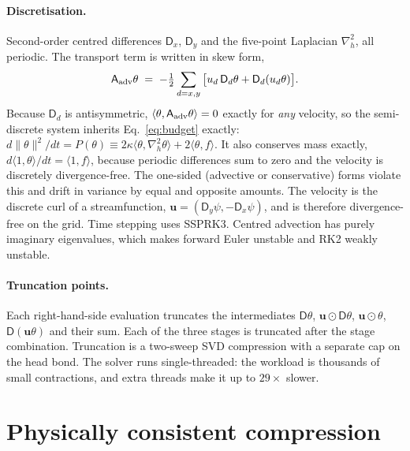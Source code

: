 \documentclass[aps,prfluids,reprint,onecolumn,amsmath,amssymb,nofootinbib,floatfix]{revtex4-2}
\begin{document}
\paragraph{Discretisation.} Second-order centred differences $\mathsf{D}_x$,
$\mathsf{D}_y$ and the five-point Laplacian $\nabla_h^2$, all periodic. The
transport term is written in skew form,
\begin{equation}
\mathsf{A}_{\rm adv}\theta \;=\; -\tfrac12\sum_{d=x,y}\big[u_d\,\mathsf{D}_d\theta
+ \mathsf{D}_d(u_d\theta)\big].
\label{eq:skew}
\end{equation}
Because $\mathsf{D}_d$ is antisymmetric, $\langle\theta,\mathsf{A}_{\rm adv}\theta\rangle=0$
exactly for \emph{any} velocity, so the semi-discrete system inherits
Eq.~\eqref{eq:budget} exactly:
$d\|\theta\|^2/dt = P(\theta) \equiv 2\kappa\langle\theta,\nabla_h^2\theta\rangle + 2\langle\theta,f\rangle$.
It also conserves mass exactly, $d\langle1,\theta\rangle/dt=\langle1,f\rangle$,
because periodic differences sum to zero and the velocity is discretely
divergence-free.
The one-sided (advective or conservative) forms violate this and drift in
variance by equal and opposite amounts. The velocity is the discrete curl of a
streamfunction, $\mathbf{u}=(\mathsf{D}_y\psi,-\mathsf{D}_x\psi)$, and is
therefore divergence-free on the grid. Time stepping uses SSPRK3. Centred advection
has purely imaginary eigenvalues, which makes forward Euler unstable and RK2
weakly unstable.

\paragraph{Truncation points.} Each right-hand-side evaluation truncates the
intermediates $\mathsf{D}\theta$, $\mathbf{u}\odot\mathsf{D}\theta$,
$\mathbf{u}\odot\theta$, $\mathsf{D}(\mathbf{u}\theta)$ and their sum. Each of
the three stages is truncated after the stage combination. Truncation is a
two-sweep SVD compression with a separate cap on the head bond. The solver runs
single-threaded: the workload is thousands of small contractions, and extra
threads make it up to $29\times$ slower.

\section{Physically consistent compression}
\label{sec:consistency}
\end{document}
